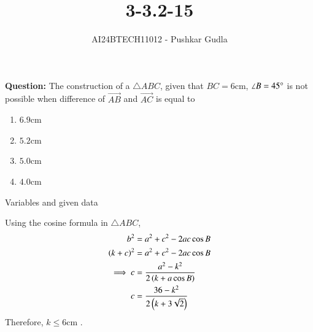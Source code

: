 \documentclass[journal]{IEEEtran}
\begin{document}

\vspace{3cm}

\title{3-3.2-15}
\author{AI24BTECH11012 - Pushkar Gudla}
{\let\newpage\relax\maketitle}

\renewcommand{\thefigure}{\theenumi}
\renewcommand{\thetable}{\theenumi}
\setlength{\intextsep}{10pt} %


\renewcommand{\thetable}{\theenumi}
\textbf{Question:} The construction of a $\triangle ABC$, given that $BC=6$cm, $\angle B=45\degree$ is not possible when difference of $\vec{AB}$ and $\vec{AC}$ is equal to
\begin{enumerate}
	\item $6.9$cm
	\item $5.2$cm
	\item $5.0$cm
	\item $4.0$cm
\end{enumerate}
\solution
\begin{table}[h!]    
  \centering
  
  \caption{Variables and given data}
  \label{tab 3.2.15}
\end{table}
Using the cosine formula in $\triangle ABC$,\\
\begin{align}
	b^2 &= a^2 + c^2 - 2ac\cos B \\
	\left(k+c\right)^2 &= a^2 + c^2 - 2ac\cos B \\
	\implies c &= \frac{a^2 - k^2}{2\left(k + a\cos B\right)}\\
	c &= \frac{36-k^2}{2\left(k + 3\sqrt{2}\right)}	
\end{align}
Therefore, $k \leq 6$cm .
\end{document}
